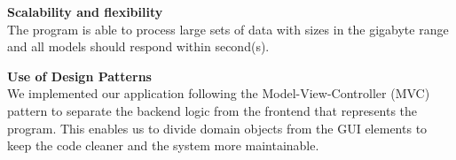 \textbf{Scalability and flexibility}\\
The program is able to process large sets of data with sizes in the gigabyte range and all models should respond within second(s).

\textbf{Use of Design Patterns} \\
We implemented our application following the Model-View-Controller (MVC) pattern to separate the backend logic from the frontend that represents the program. This enables us to divide domain objects from the GUI elements to keep the code cleaner and the system more maintainable.
